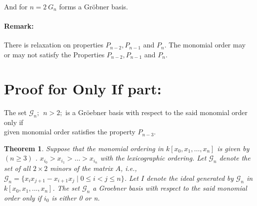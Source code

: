 \documentclass[12pt,a4paper]{article}
\newtheorem{theorem}{Theorem}
\theoremstyle{definition}
\begin{document}
And for $n=2\ G_n$ forms a Gr\"{o}bner basis.



\paragraph*{Remark:}
There is relaxation on properties $P_{n-2}, P_{n-1}$ and $P_{n}$. The monomial order may or may not satisfy the Properties $P_{n-2}, P_{n-1}$ and $P_{n}$.
















\section*{Proof for Only If part:}

The set $\mathcal{G}_n;\ \ n>2;$ is a Gr\"{o}ebner basis with respect to the said monomial order only if \\
given monomial order satisfies the property $P_{n-3}$.\\




\begin{theorem}
Suppose that the monomial ordering in $k[x_{0},x_{1}, \ldots , x_{n}]$ is given by $( n \geq 3)$ .
$x_{i_{0}} > x_{i_{1}} > \ldots > x_{i_{n}} $ with the lexicographic ordering. Let $\mathcal{G}_n$ denote the set of all $2\times 2$ minors of the matrix $A$, i.e., $\mathcal{G}_n = \{x_{i}x_{j+1}-x_{i+1}x_{j} \mid 0 \leq i < j \leq n\}$. Let $I$ denote the  ideal  generated by $\mathcal{G}_n$ in $k[x_{0}, x_{1},...,x_{n}]$. The set $\mathcal{G}_n$ a Groebner  basis with respect to the said monomial order only if $i_{0}$ is either 0 or n.
\end{theorem}
\end{document}
